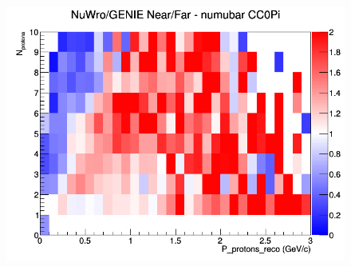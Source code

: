 \documentclass[12pt]{article}
\begin{document}
\begin{figure}[h]
\endminipage
{}
\includegraphics[width=\linewidth]{eff_N_P/GAr/protons/ratios/CC0Pi_NuWro_GENIE_numubar_NF_N_P.png}
\endminipage
\newline
\end{figure}
\clearpage
\end{document}
